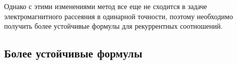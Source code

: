 
Однако с этими изменениями метод все еще не сходится в задаче электромагнитного 
рассеяния \cite{stavtsev2009application} в одинарной точности, поэтому необходимо 
получить более устойчивые формулы для рекуррентных соотношений. 

\subsection{Более устойчивые формулы}

